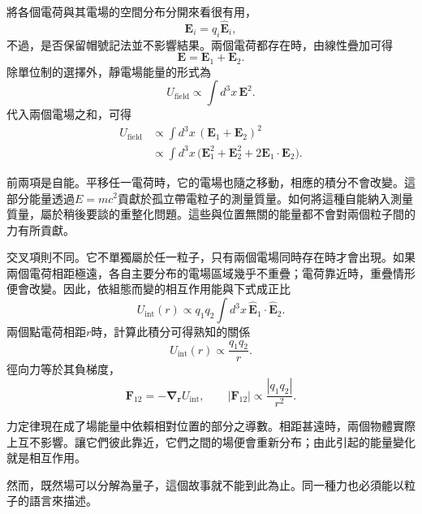 將各個電荷與其電場的空間分布分開來看很有用，
\begin{equation}
\mathbf E_i=q_i\widehat{\mathbf E}_i,
\end{equation}
不過，是否保留帽號記法並不影響結果。兩個電荷都存在時，由線性疊加可得
\begin{equation}
\mathbf{E}=\mathbf{E}_1+\mathbf{E}_2.
\end{equation}
除單位制的選擇外，靜電場能量的形式為
\begin{equation}
U_{\text{field}}\propto\int d^3x\,\mathbf{E}^2.
\end{equation}
代入兩個電場之和，可得
\begin{align}
U_{\text{field}}
&\propto\int d^3x\,(\mathbf{E}_1+\mathbf{E}_2)^2 \\
&\propto\int d^3x\,\bigl(\mathbf{E}_1^2+\mathbf{E}_2^2
  +2\mathbf{E}_1\!\cdot\!\mathbf{E}_2\bigr).
\end{align}

前兩項是自能。平移任一電荷時，它的電場也隨之移動，相應的積分不會改變。這部分能量透過\(E=mc^2\)貢獻於孤立帶電粒子的測量質量。如何將這種自能納入測量質量，屬於稍後要談的重整化問題。這些與位置無關的能量都不會對兩個粒子間的力有所貢獻。

交叉項則不同。它不單獨屬於任一粒子，只有兩個電場同時存在時才會出現。如果兩個電荷相距極遠，各自主要分布的電場區域幾乎不重疊；電荷靠近時，重疊情形便會改變。因此，依組態而變的相互作用能與下式成正比
\begin{equation}
U_{\text{int}}(r)\propto q_1q_2\int d^3x\,
\widehat{\mathbf E}_1\!\cdot\!\widehat{\mathbf E}_2.
\end{equation}
兩個點電荷相距\(r\)時，計算此積分可得熟知的關係
\begin{equation}
U_{\text{int}}(r)\propto\frac{q_1q_2}{r}.
\end{equation}
徑向力等於其負梯度，
\begin{equation}
\mathbf F_{12}=-\boldsymbol\nabla_{\mathbf r}U_{\text{int}},
\qquad
|\mathbf F_{12}|\propto\frac{|q_1q_2|}{r^2}.
\end{equation}

力定律現在成了場能量中依賴相對位置的部分之導數。相距甚遠時，兩個物體實際上互不影響。讓它們彼此靠近，它們之間的場便會重新分布；由此引起的能量變化就是相互作用。

然而，既然場可以分解為量子，這個故事就不能到此為止。同一種力也必須能以粒子的語言來描述。

